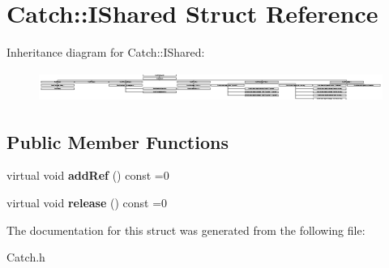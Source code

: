 \hypertarget{struct_catch_1_1_i_shared}{\section{Catch\-:\-:I\-Shared Struct Reference}
\label{struct_catch_1_1_i_shared}
}
Inheritance diagram for Catch\-:\-:I\-Shared\-:\begin{figure}[H]
\begin{center}
\leavevmode
\includegraphics[height=1.002237cm]{struct_catch_1_1_i_shared}
\end{center}
\end{figure}
\subsection*{Public Member Functions}
\begin{DoxyCompactItemize}
\item 
\hypertarget{struct_catch_1_1_i_shared_ae383df68557cdaf0910b411af04d9e33}{virtual void {\bfseries add\-Ref} () const =0}\label{struct_catch_1_1_i_shared_ae383df68557cdaf0910b411af04d9e33}

\item 
\hypertarget{struct_catch_1_1_i_shared_a002f52624728a763956fb6f230cb2f57}{virtual void {\bfseries release} () const =0}\label{struct_catch_1_1_i_shared_a002f52624728a763956fb6f230cb2f57}

\end{DoxyCompactItemize}


The documentation for this struct was generated from the following file\-:\begin{DoxyCompactItemize}
\item 
Catch.\-h\end{DoxyCompactItemize}

